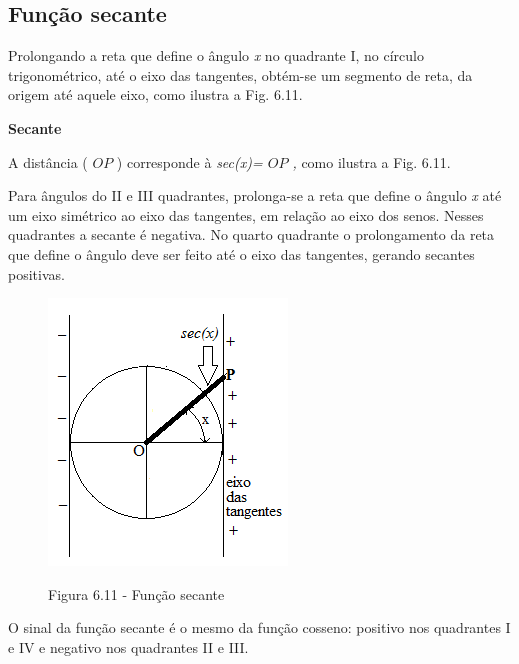 \subsection{Função secante}

Prolongando a reta que define o ângulo \textit{x }no quadrante I, no círculo trigonométrico, até o eixo das tangentes, obtém-se um segmento de reta, da origem até aquele eixo, como ilustra a Fig. 6.11.

\begin{caixa}
\textbf{Secante}

\begin{multicols}{2}

A distância ( \( OP \) ) corresponde à \textit{sec(x)= \(  OP \) , }como ilustra a Fig. 6.11.

Para ângulos do II e III quadrantes, prolonga-se a reta que define o ângulo \textit{x }até um eixo simétrico ao eixo das tangentes, em relação ao eixo dos senos. Nesses quadrantes a secante é negativa. No quarto quadrante o prolongamento da reta que define o ângulo deve ser feito até o eixo das tangentes, gerando secantes positivas.

\begin{figure}[H]
    \begin{Center}
        \includegraphics[width=2.5in,height=2.79in]{capitulos/trigonometria_e_funcoes_trigonometricas/media/image40.png}

        Figura 6.11 - Função secante
    \end{Center}
\end{figure}

\end{multicols}
\end{caixa}

O sinal da função secante é o mesmo da função cosseno: positivo nos quadrantes I e IV e negativo nos quadrantes II e III.

